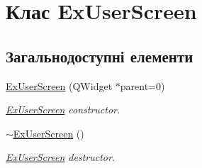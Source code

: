 \hypertarget{classExUserScreen}{\section{Клас Ex\-User\-Screen}
\label{classExUserScreen}
}
\subsection*{Загальнодоступні елементи}
\begin{DoxyCompactItemize}
\item 
\hyperlink{classExUserScreen_a8642db4f09c4528daf7e22ce2dcc1b47}{Ex\-User\-Screen} (Q\-Widget $\ast$parent=0)
\begin{DoxyCompactList}\small\item\em \hyperlink{classExUserScreen}{Ex\-User\-Screen} constructor. \end{DoxyCompactList}\item 
\hypertarget{classExUserScreen_a61421cd56bb9b54501c4cb34d297891f}{\hyperlink{classExUserScreen_a61421cd56bb9b54501c4cb34d297891f}{$\sim$\-Ex\-User\-Screen} ()}\label{classExUserScreen_a61421cd56bb9b54501c4cb34d297891f}

\begin{DoxyCompactList}\small\item\em \hyperlink{classExUserScreen}{Ex\-User\-Screen} destructor. \end{DoxyCompactList}\end{DoxyCompactItemize}
